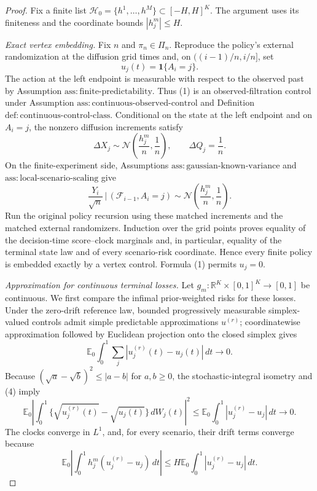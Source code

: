 \documentclass{article}
\begin{document}
\begin{proof}
Fix a finite list \(\mathcal H_0=\{h^1,\ldots,h^M\}\subset[-H,H]^K\).  The argument uses its finiteness and the coordinate bounds \(|h_j^m|\leq H\).

\emph{Exact vertex embedding.}  Fix \(n\) and \(\pi_n\in\Pi_n\).  Reproduce the policy's external randomization at the diffusion grid times and, on \(((i-1)/n,i/n]\), set
\[
 u_j(t)=\mathbf 1\{A_i=j\}.                                      \tag{1}
\]
The action at the left endpoint is measurable with respect to the observed past by Assumption \(\mathrm{ass{:}finite\text{-}predictability}\).  Thus (1) is an observed-filtration control under Assumption \(\mathrm{ass{:}continuous\text{-}observed\text{-}control}\) and Definition \(\mathrm{def{:}continuous\text{-}control\text{-}class}\).  Conditional on the state at the left endpoint and on \(A_i=j\), the nonzero diffusion increments satisfy
\[
 \Delta X_j\sim\mathcal N\!\left(\frac{h_j^m}{n},\frac1n\right),
 \qquad \Delta Q_j=\frac1n.                                      \tag{2}
\]
On the finite-experiment side, Assumptions \(\mathrm{ass{:}gaussian\text{-}known\text{-}variance}\) and \(\mathrm{ass{:}local\text{-}scenario\text{-}scaling}\) give
\[
 \frac{Y_i}{\sqrt n}\,\bigg|\,(\mathcal F_{i-1},A_i=j)
 \sim\mathcal N\!\left(\frac{h_j^m}{n},\frac1n\right).          \tag{3}
\]
Run the original policy recursion using these matched increments and the matched external randomizers.  Induction over the grid points proves equality of the decision-time score--clock marginals and, in particular, equality of the terminal state law and of every scenario-risk coordinate.  Hence every finite policy is embedded exactly by a vertex control.  Formula (1) permits \(u_j=0\).

\emph{Approximation for continuous terminal losses.}  Let \(g_m:\mathbb R^K\times[0,1]^K\to[0,1]\) be continuous.  We first compare the infimal prior-weighted risks for these losses.  Under the zero-drift reference law, bounded progressively measurable simplex-valued controls admit simple predictable approximations \(u^{(r)}\); coordinatewise approximation followed by Euclidean projection onto the closed simplex gives
\[
 \mathbb E_0\int_0^1\sum_j|u_j^{(r)}(t)-u_j(t)|\,dt\longrightarrow0. \tag{4}
\]
Because \((\sqrt a-\sqrt b)^2\leq|a-b|\) for \(a,b\geq0\), the stochastic-integral isometry and (4) imply
\[
 \mathbb E_0\left|\int_0^1
   \{\sqrt{u_j^{(r)}(t)}-\sqrt{u_j(t)}\}\,dW_j(t)\right|^2
 \leq \mathbb E_0\int_0^1|u_j^{(r)}-u_j|\,dt\longrightarrow0.    \tag{5}
\]
The clocks converge in \(L^1\), and, for every scenario, their drift terms converge because
\[
 \mathbb E_0\left|\int_0^1h_j^m(u_j^{(r)}-u_j)\,dt\right|
 \leq H\mathbb E_0\int_0^1|u_j^{(r)}-u_j|\,dt.                   \tag{6}
\]


\end{proof}
\end{document}
